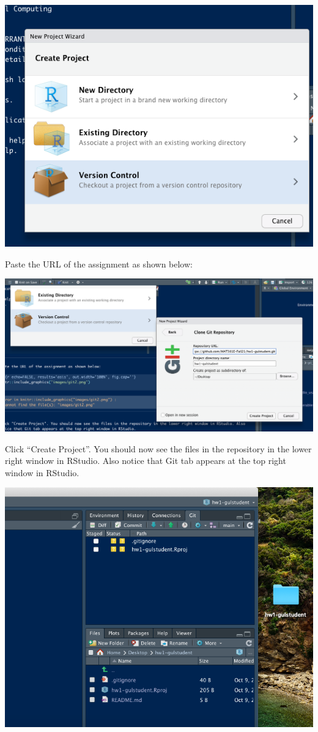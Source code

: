\documentclass[
  12pt,
]{article}
\begin{document}
\includegraphics[width=1\linewidth]{images/git1}

Paste the URL of the assignment as shown below:

\includegraphics[width=1\linewidth]{images/git2}

Click ``Create Project''. You should now see the files in the repository
in the lower right window in RStudio. Also notice that Git tab appears
at the top right window in RStudio.

\includegraphics[width=1\linewidth]{images/git3}
\end{document}
